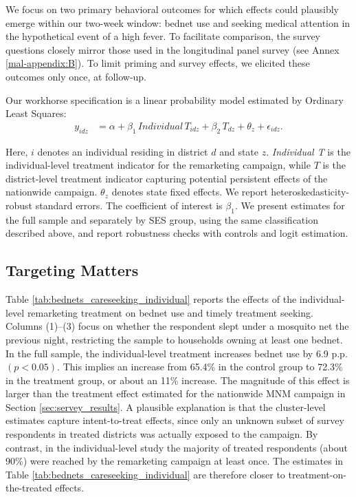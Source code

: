 We focus on two primary behavioral outcomes for which effects could plausibly emerge within our two-week window: bednet use and seeking medical attention in the hypothetical event of a high fever. To facilitate comparison, the survey questions closely mirror those used in the longitudinal panel survey (see Annex \ref{mal-appendix:B}). To limit priming and survey effects, we elicited these outcomes only once, at follow-up.

Our workhorse specification is a linear probability model estimated by Ordinary Least Squares:
\begin{align}
y_{idz} &= \alpha + \beta_{1} \, Individual\,T_{idz} + \beta_{2} \, T_{dz} + \theta_{z} + \epsilon_{idz}.
\end{align}

Here, $i$ denotes an individual residing in district $d$ and state $z$. \textit{Individual T} is the individual-level treatment indicator for the remarketing campaign, while $T$ is the district-level treatment indicator capturing potential persistent effects of the nationwide campaign. $\theta_{z}$ denotes state fixed effects. We report heteroskedasticity-robust standard errors. The coefficient of interest is $\beta_{1}$. We present estimates for the full sample and separately by SES group, using the same classification described above, and report robustness checks with controls and logit estimation.

\subsection{Targeting Matters}

Table \ref{tab:bednets_careseeking_individual} reports the effects of the individual-level remarketing treatment on bednet use and timely treatment seeking. Columns (1)--(3) focus on whether the respondent slept under a mosquito net the previous night, restricting the sample to households owning at least one bednet. In the full sample, the individual-level treatment increases bednet use by 6.9 p.p. $(p<0.05)$. This implies an increase from 65.4\% in the control group to 72.3\% in the treatment group, or about an 11\% increase. The magnitude of this effect is larger than the treatment effect estimated for the nationwide MNM campaign in Section \ref{sec:servey_results}. A plausible explanation is that the cluster-level estimates capture intent-to-treat effects, since only an unknown subset of survey respondents in treated districts was actually exposed to the campaign. By contrast, in the individual-level study the majority of treated respondents (about 90\%) were reached by the remarketing campaign at least once. The estimates in Table \ref{tab:bednets_careseeking_individual} are therefore closer to treatment-on-the-treated effects.

